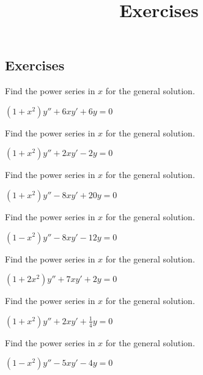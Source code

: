\documentclass{ximera}
\title{Exercises} \license{CC BY-NC-SA 4.0}
\begin{document}
\begin{abstract}
\end{abstract}
\maketitle

\begin{onlineOnly}
\section*{Exercises}
\end{onlineOnly}


\begin{problem}\label{exer:7.2.1}
Find the power series in $x$ for the general solution.

$(1+x^2)y''+6xy'+6y=0$
\end{problem}

\begin{problem}\label{exer:7.2.2}
Find the power series in $x$ for the general solution.

$(1+x^2)y''+2xy'-2y=0$
\end{problem}

\begin{problem}\label{exer:7.2.3}
Find the power series in $x$ for the general solution.

$(1+x^2)y''-8xy'+20y=0$
\end{problem}

\begin{problem}\label{exer:7.2.4} 
Find the power series in $x$ for the general solution.

$(1-x^2)y''-8xy'-12y=0$
\end{problem}

\begin{problem}\label{exer:7.2.5} 
Find the power series in $x$ for the general solution.

$(1+2x^2)y''+7xy'+2y=0$
\end{problem}

\begin{problem}\label{exer:7.2.6} Find the power series in $x$ for the general solution.

$(1+x^2)y''+2xy'+\frac{1}{4}y=0$
\end{problem}

\begin{problem}\label{exer:7.2.7}
Find the power series in $x$ for the general solution.

$(1-x^2)y''-5xy'-4y=0$
\end{problem}
\end{document}
